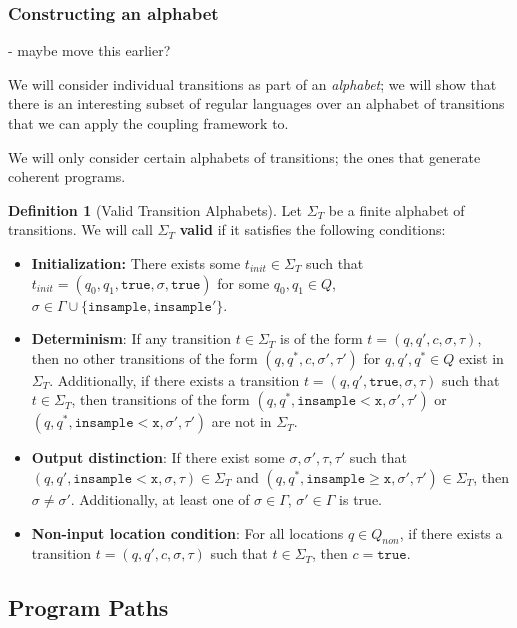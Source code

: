 \documentclass[12pt]{article}
\newcommand{\gguard}[1][x]{\texttt{insample}\geq#1}
\newcommand{\lguard}[1][x]{\texttt{insample} < #1}
\theoremstyle{definition}
\newtheorem{defn}[thm]{Definition}
\begin{document}
\subsubsection{Constructing an alphabet}

{\color{red} - maybe move this earlier?}

We will consider individual transitions as part of an \textit{alphabet}; we will show that there is an interesting subset of regular languages over an alphabet of transitions that we can apply the coupling framework to. 

We will only consider certain alphabets of transitions; the ones that generate coherent programs. 

\begin{defn}[Valid Transition Alphabets]
    Let $\Sigma_T$ be a finite alphabet of transitions. We will call $\Sigma_T$ \textbf{valid} if it satisfies the following conditions:
    \begin{itemize}
        \item \textbf{Initialization:} There exists some $t_{init}\in \Sigma_T$ such that $t_{init} = (q_0, q_1, \texttt{true}, \sigma, \texttt{true})$ for some $q_0, q_1\in Q$, $\sigma \in \Gamma\cup\{\texttt{insample}, \texttt{insample}'\}$. 
        \item \textbf{Determinism}: If any transition $t\in \Sigma_T$ is of the form $t=(q, q', c, \sigma, \tau)$, then no other transitions of the form $(q, q^*, c, \sigma', \tau')$ for $q, q', q^*\in Q$ exist in $\Sigma_T$. 
        Additionally, if there exists a transition $t=(q, q', \texttt{true}, \sigma, \tau)$ such that $t\in \Sigma_T$, then transitions of the form $(q, q^*, \lguard[\texttt{x}], \sigma', \tau')$ or $(q, q^*, \lguard[\texttt{x}], \sigma', \tau')$ are not in $\Sigma_T$. 
        \item \textbf{Output distinction}: If there exist some $\sigma, \sigma', \tau, \tau'$ such that $(q, q', \lguard[\texttt{x}], \sigma, \tau)\in \Sigma_T$  and $(q, q^*, \gguard[\texttt{x}], \sigma', \tau') \in \Sigma_T$, then $\sigma \neq \sigma'$. Additionally, at least one of $\sigma\in \Gamma$, $\sigma'\in \Gamma$ is true.
        \item \textbf{Non-input location condition}: For all locations $q\in Q_{non}$, if there exists a transition $t=(q, q', c, \sigma, \tau)$ such that $t\in \Sigma_T$, then $c = \texttt{true}$.
    \end{itemize}
\end{defn}

\subsection{Program Paths}
\end{document}
